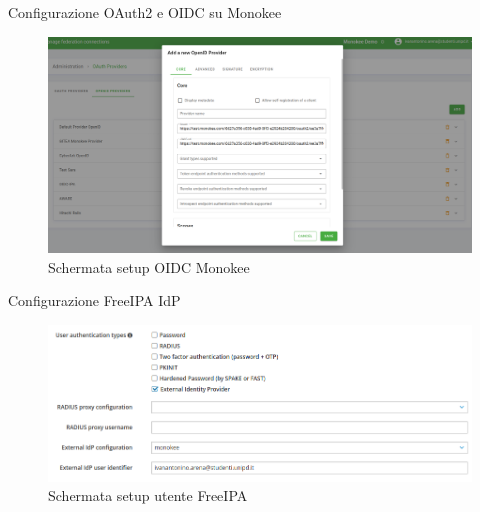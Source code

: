\documentclass{beamer}
\begin{document}

	
	\begin{frame}{Configurazione OAuth2 e OIDC su Monokee}
		\begin{figure}[H] 
			\centering 
			\includegraphics[width=\columnwidth]{immagini/monokee-oidc.png} 
			\caption{Schermata setup OIDC Monokee}
			\label{fig:oidc-setup}
		\end{figure}
		
	\end{frame}
	
	\begin{frame}{Configurazione FreeIPA IdP}
		
		\begin{figure}[H] 
			\centering 
			\includegraphics[width=\columnwidth]{immagini/appendici/ipa-user.png} 
			\caption{Schermata setup utente FreeIPA}
			\label{fig:ipa-setup-user}
		\end{figure}
		
		
	\end{frame}
	
\end{document}
